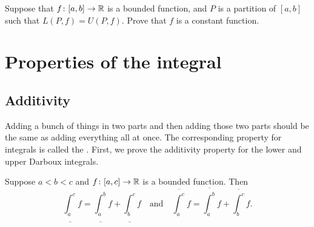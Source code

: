 \begin{exercise}
Suppose that $f \colon [a,b] \to {\mathbb{R}}$ is a bounded function, and $P$ is a
partition of $[a,b]$ such that $L(P,f)=U(P,f)$.  Prove that $f$ is a
constant function.
\end{exercise}



\sectionnewpage
\section{Properties of the integral}
\label{sec:rintprop}



\subsection{Additivity}

Adding a bunch of things in two parts and then adding those two parts
should be the same as adding everything all at once.
The corresponding property for integrals is called the
.  First, we prove the additivity
property for the lower and upper Darboux integrals.

\begin{lemma} \label{lemma:darbouxadd}
Suppose $a < b < c$ and $f \colon [a,c] \to {\mathbb{R}}$ is a bounded function.
Then
\begin{equation*}
\underline{\int_a^c} f
=
\underline{\int_a^b} f
+
\underline{\int_b^c} f
\quad \text{and} \quad
\overline{\int_a^c} f
=
\overline{\int_a^b} f
+
\overline{\int_b^c} f .
\end{equation*}
\end{lemma}


